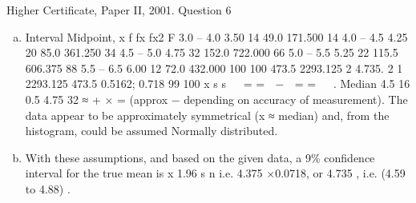 \documentclass[a4paper,12pt]{article}
\begin{document}


Higher Certificate, Paper II, 2001. Question 6
\begin{enumerate}[(a)]
\item 
Interval Midpoint, x f fx fx2 F
3.0 – 4.0 3.50 14 49.0 171.500 14
4.0 – 4.5 4.25 20 85.0 361.250 34
4.5 – 5.0 4.75 32 152.0 722.000 66
5.0 – 5.5 5.25 22 115.5 606.375 88
5.5 – 6.5 6.00 12 72.0 432.000 100
100 473.5 2293.125
2
4.735. 2 1 2293.125 473.5 0.5162; 0.718
99 100
x s s
 
= =  −  = =
 
.
Median 4.5 16 0.5 4.75
32
≈ + × = (approx − depending on accuracy of measurement).
The data appear to be approximately symmetrical (x ≈ median) and, from the
histogram, could be assumed Normally distributed.
\item With these assumptions, and based on the given data, a 9\% confidence
interval for the true mean is x 1.96 s
n
\pm 
i.e. 4.375 ×0.0718, or 4.735 , i.e. (4.59 to 4.88) .

\end{enumerate}
\end{document}
